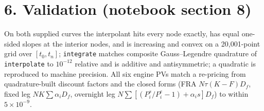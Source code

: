 \documentclass[11pt]{article}
\begin{document}
\section*{6. Validation (notebook section 8)}
On both supplied curves the interpolant hits every node exactly, has equal one-sided slopes at the interior nodes, and is increasing and convex on a 20,001-point grid over $[t_0,t_n]$; \texttt{integrate} matches composite Gauss--Legendre quadrature of \texttt{interpolate} to $10^{-12}$ relative and is additive and antisymmetric; a quadratic is reproduced to machine precision. All six engine PVs match a re-pricing from quadrature-built discount factors and the closed forms (FRA $N\tau(K-F)D_f$, fixed leg $NK\sum\alpha_iD_f$, overnight leg $N\sum[(P^s_i/P^e_i-1)+\alpha_i s]D_f$) to within $5\times10^{-9}$.
\end{document}
